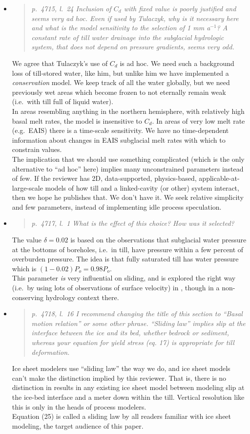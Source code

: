 \documentclass[11pt,reqno]{amsart}
\newcommand{\reply}[2]{
\medskip\medskip
\item  \begin{quote}
\emph{#1}
\end{quote}

\medskip
\noindent #2}
\begin{document}
\begin{itemize}
\reply{p.~4715, l.~24 Inclusion of $C_d$ with fixed value is poorly justified and seems very ad hoc.  Even if used by Tulaczyk, why is it necessary here and what is the model sensitivity to the selection of 1 mm a$^{-1}$?  A constant rate of till water drainage into the subglacial hydrologic system, that does not depend on pressure gradients, seems very odd.}
{We agree that Tulaczyk's use of $C_d$ is ad hoc.  We need such a background loss of till-stored water, like him, but unlike him we have implemented a \emph{conservation} model.  We keep track of all the water globally, but we need previously wet areas which become frozen to not eternally remain weak (i.e.~with till full of liquid water).\\
\indent In areas resembling anything in the northern hemisphere, with relatively high basal melt rates, the model is insensitive to $C_d$.  In areas of very low melt rate (e.g.~EAIS) there is a time-scale sensitivity.  We have no time-dependent information about changes in EAIS subglacial melt rates with which to constrain values. \\
\indent The implication that we should use something complicated (which is the only alternative to ``ad hoc'' here) implies many unconstrained parameters instead of few.   If the reviewer has 2D, data-supported, physics-based, applicable-at-large-scale models of how till and a linked-cavity (or other) system interact, then we hope he publishes that.  We don't have it.  We seek relative simplicity and few parameters, instead of implementing idle process speculation.}

\reply{p.~4717, l.~1 What is the effect of this choice? How was it selected?}
{The value $\delta=0.02$ is based on the observations that subglacial water pressure at the bottoms of boreholes, i.e.~in till, have pressure within a few percent of overburden pressure.  The idea is that fully saturated till has water pressure which is $(1-0.02)P_o=0.98 P_o$. \\
\indent  This parameter \emph{is} very influential on sliding, and is explored the right way (i.e.~by using lots of observations of surface velocity) in \cite{AschwandenAdalgeirsdottirKhroulev}, though in a non-conserving hydrology context there.}

\reply{p.~4718, l.~16 I recommend changing the title of this section to ``Basal motion relation'' or some other phrase. ``Sliding law'' implies slip at the interface between the ice and its bed, whether bedrock or sediment, whereas your equation for yield stress (eq. 17) is appropriate for till deformation.}
{Ice sheet modelers use ``sliding law'' the way we do, and ice sheet models can't make the distinction implied by this reviewer.  That is, there is no distinction in results in any existing ice sheet model between modeling slip at the ice-bed interface and a meter down within the till.  Vertical resolution like this is only in the heads of process modelers. \\
\indent Equation (25) is called a sliding law by all readers familiar with ice sheet modeling, the target audience of this paper.}


\end{itemize}
\end{document}
